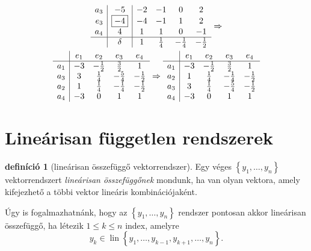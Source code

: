 \documentclass[9pt, a4paper, showtrims]{memoir}
\theoremstyle{plain}
\theoremstyle{remark}
\theoremstyle{definition}
\newtheorem{definition}[proposition]{definíció}
\DeclareMathOperator{\lin}{lin}
\begin{document}
\begin{multline*}
\begin{array}{r|c|cccc}
		a_3 & -5         & -2  & -1          & 0            & 2            \\
		e_3 & \boxed{-4} & -4  & -1          & 1            & 2            \\
		a_4 & 4          & 1   & 1           & 0            & -1           \\
		\hline
		    & \delta     & 1   & \frac{1}{4} & -\frac{1}{4} & -\frac{1}{2}
	\end{array}\Rightarrow
	\\
	\begin{array}{r|cccc}
		    & e_1 & e_2          & e_3          & e_4          \\
		\hline
		a_1 & -3  & -\frac{1}{2} & \frac{3}{2}  & 1            \\
		a_3 & 3   & \frac{1}{4}  & -\frac{5}{4} & -\frac{1}{2} \\
		a_2 & 1   & \frac{1}{4}  & -\frac{1}{4} & -\frac{1}{2} \\
		a_4 & -3  & 0            & 1            & 1
	\end{array}\Rightarrow
	\begin{array}{r|cccc}
		    & e_1 & e_2          & e_3          & e_4          \\
		\hline
		a_1 & -3  & -\frac{1}{2} & \frac{3}{2}  & 1            \\
		a_2 & 1   & \frac{1}{4}  & -\frac{1}{4} & -\frac{1}{2} \\
		a_3 & 3   & \frac{1}{4}  & -\frac{5}{4} & -\frac{1}{2} \\
		a_4 & -3  & 0            & 1            & 1
	\end{array}
\end{multline*}

\section{Lineárisan független rendszerek}
\begin{definition}[lineárisan összefüggő vektorrendszer]
	Egy véges $\left\{ y_1,\ldots,y_n \right\}$ vektorrendszert \emph{lineárisan összefüggőnek}
	mondunk, ha van olyan vektora, amely kifejezhető a többi vektor lineáris kombinációjaként.
\end{definition}
Úgy is fogalmazhatnánk, hogy az $\left\{ y_1,\ldots,y_n \right\}$ rendszer pontosan akkor
lineárisan összefüggő, ha létezik $1\leq k\leq n$ index, amelyre
\[
	y_k\in\lin\left\{ y_1,\ldots,y_{k-1},y_{k+1},\ldots,y_n \right\}.
\]
\end{document}
